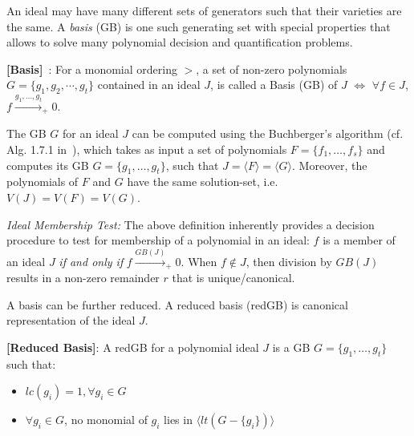 An ideal may have many different sets of generators such that
their varieties are the same. A {\it \Grobner basis} (GB) is
one such generating set with special properties that allows 
to solve many polynomial decision and quantification problems. 
\begin{Definition}
\label{def:gb}
{\bf [\Grobner Basis]}~\cite{gb_book}: 
For a monomial ordering $>$, a set of non-zero polynomials $G =
\{g_1,g_2,\cdots,g_t\}$ contained in an ideal $J$, is called a
\Grobner Basis (GB) of $J$ $\iff$
$\forall f \in J$, $f\xrightarrow{g_1,\dots,g_t}_+0$. 
\end{Definition}
The GB $G$ for an ideal $J$ can be computed using the Buchberger's
algorithm  %
(cf. Alg. 1.7.1 in~\cite{gb_book}), which
takes as input a set of polynomials $F = \{f_1,\dots, f_s\}$ and
computes its GB $G = \{g_1,\dots,g_t\}$, such that $J = \langle
F\rangle = \langle G\rangle$. Moreover, the polynomials of $F$ and $G$
have the same solution-set, i.e. $V(J) = V(F) = V(G)$. 

{\it Ideal Membership Test:} The above definition inherently provides
a decision procedure to test for membership of a polynomial in an ideal:
$f$ is a member of an ideal $J$ {\it if and only if} 
$f\xrightarrow{GB(J)}_+0$.
When $f\notin J$,
then division by $GB(J)$ results in a non-zero remainder $r$ that is
unique/canonical. 

A \Grobner basis can be further reduced. A reduced \Grobner basis
(redGB) is canonical representation of the ideal $J$.

\begin{Definition} \label{def:rgb}
{\bf [Reduced \Grobner Basis]}:
    A redGB for a polynomial ideal $J$ is 
    a GB $G=\{g_{1},\dots,g_{t}\}$ such that:
    \begin{itemize}
        \item $lc(g_{i})=1,\forall g_{i}\in G$
        \item $\forall g_{i} \in G$, no monomial of $g_{i}$ 
        lies in $\langle lt(G-\{g_{i}\})\rangle$
    \end{itemize}
\end{Definition}

